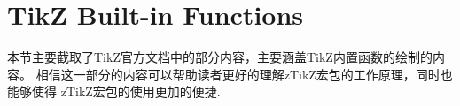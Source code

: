 \chapter{TikZ Built-in Functions}
\label{chap:tikz_function_plot}
本节主要截取了TikZ官方文档中的部分内容，主要涵盖TikZ内置函数的绘制的内容。
相信这一部分的内容可以帮助读者更好的理解zTikZ宏包的工作原理，同时也能够使得
zTikZ宏包的使用更加的便捷.

